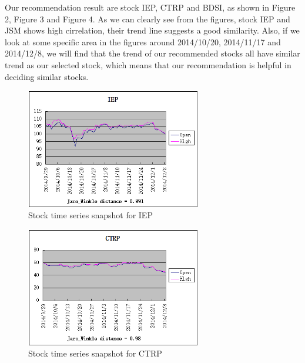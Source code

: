 \documentclass[10pt, conference, compsocconf]{IEEEtran}
\begin{document}
\vspace{1mm}
\par
Our recommendation result are stock IEP, CTRP and BDSI, as shown in Figure 2, Figure 3 and Figure 4. As we can clearly see from the figures, stock IEP and JSM shows high cirrelation, their trend line suggests a good similarity. Also, if we look at some specific area in the figures around 2014/10/20, 2014/11/17 and 2014/12/8, we will find that the trend of our recommended stocks all have similar trend as our selected stock, which means that our recommendation is helpful in deciding similar stocks.\\
\par
\vspace{2mm}
 \begin{figure}[!h]
\includegraphics[width=3in]{figures/IEP}
\caption{Stock time series snapshot for IEP}
\vspace{1mm}
\end{figure}
\par

\par
\vspace{2mm}
 \begin{figure}[!h]
\includegraphics[width=3in]{figures/CTRP}
\caption{Stock time series snapshot for CTRP}
\vspace{1mm}
\end{figure}
\par
\end{document}
